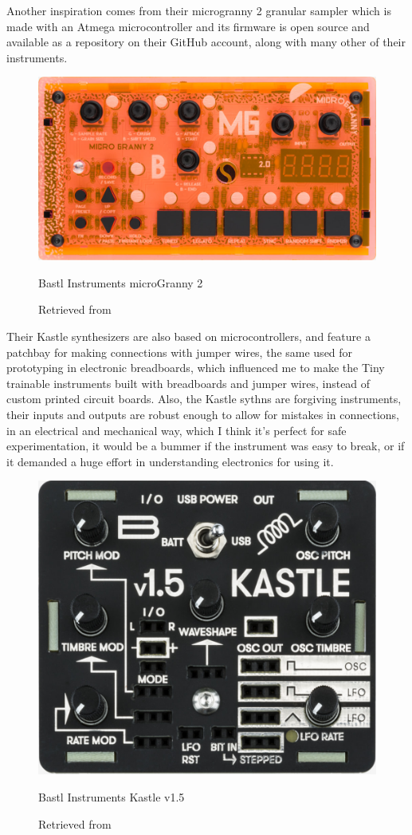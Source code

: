 Another inspiration comes from their microgranny 2 granular sampler which is made with an Atmega microcontroller and its firmware is open source and available as a repository on their GitHub account, along with many other of their instruments.

\begin{figure}[ht]
  \centering
  \includegraphics[width=0.75\linewidth,height=0.25\textheight,keepaspectratio]{images/bastl-microgranny-2.jpg}
  \caption{Bastl Instruments microGranny 2}
  \caption*{Retrieved from \cite{website-bastl-instruments-current}}
  \label{fig:bastl-microgranny-2}
\end{figure}

Their Kastle synthesizers are also based on microcontrollers, and feature a patchbay for making connections with jumper wires, the same used for prototyping in electronic breadboards, which influenced me to make the Tiny trainable instruments built with breadboards and jumper wires, instead of custom printed circuit boards. Also, the Kastle sythns are forgiving instruments, their inputs and outputs are robust enough to allow for mistakes in connections, in an electrical and mechanical way, which I think it's perfect for safe experimentation, it would be a bummer if the instrument was easy to break, or if it demanded a huge effort in understanding electronics for using it.

\begin{figure}[ht]
  \centering
  \includegraphics[width=0.75\linewidth,height=0.25\textheight,keepaspectratio]{images/bastl-kastle-v15.jpg}
  \caption{Bastl Instruments Kastle v1.5}
  \caption*{Retrieved from \cite{website-bastl-instruments-current}}
  \label{fig:bastl-kastle-v15}
\end{figure}

